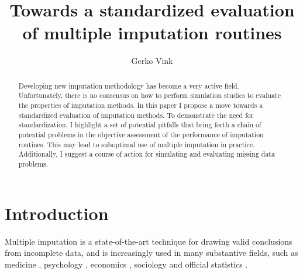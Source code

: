 \documentclass[12pt, a4paper]{article}
\begin{document}
\title{Towards a standardized evaluation of multiple imputation routines}

\author{Gerko Vink}
\date{}
\maketitle

\begin{abstract}
Developing new imputation methodology has become a very active field. Unfortunately, there is no consensus on how to perform simulation studies to evaluate the properties of imputation methods. In this paper I propose a move towards a standardized evaluation of imputation methods. To demonstrate the need for standardization, I highlight a set of potential pitfalls that bring forth a chain of potential problems in the objective assessment of the performance of imputation routines. This may lead to suboptimal use of multiple imputation in practice. Additionally, I suggest a course of action for simulating and evaluating missing data problems. 
\end{abstract}

\section*{Introduction}
\label{intro}

Multiple imputation \citep{rubin1987} is a state-of-the-art technique for drawing valid conclusions from incomplete data, and is increasingly used in many substantive fields, such as medicine \citep[see e.g.][]{pulkki2015cumulative,alkire2015global,stinesen2015reduced}, psychology \citep[e.g.][]{sorbi2014medium}, economics \citep[e.g.][]{wong2015economic,dafoe2013democratic,allan2015determinants}, sociology \citep[e.g.][]{crowley2014flexible,de2014religiosity} and official statistics \citep[e.g.][]{little2012calibrated,klausch2015selection}. 
\end{document}
